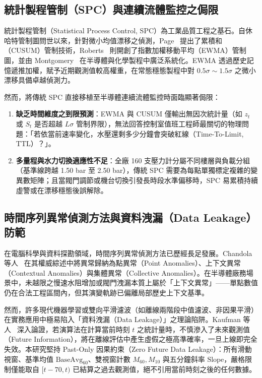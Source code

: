 \documentclass[fontset=none, a4paper, 12pt]{ctexart}
\begin{document}
\begin{doublespace}
\subsection{統計製程管制（SPC）與連續流體監控之侷限}
統計製程管制（Statistical Process Control, SPC）為工業品質工程之基石。自休哈特管制圖問世以來，針對微小均值漂移之偵測，Page~\cite{page1954continuous} 提出了累積和（CUSUM）管制技術，Roberts~\cite{roberts1959control} 則開創了指數加權移動平均（EWMA）管制圖，並由 Montgomery~\cite{montgomery2020statistical} 在半導體與化學製程中廣泛系統化。EWMA 透過歷史記憶遞推加權，賦予近期觀測值較高權重，在常態穩態製程中對 $0.5\sigma \sim 1.5\sigma$ 之微小漂移具備卓越偵測力。

然而，將傳統 SPC 直接移植至半導體連續流體監控時面臨顯著侷限：
\begin{enumerate}
    \item \textbf{缺乏時間維度之到限預測}：EWMA 與 CUSUM 僅輸出無因次統計量（如 $z_t$ 或 $S_t$ 是否超越 $L\sigma$ 管制界限），無法回答控制室值班工程師最關切的物理問題：「若依當前速率變化，水壓還剩多少分鐘會突破紅線（Time-To-Limit, TTL）？」。
    \item \textbf{多量程與水力切換適應性不足}：全廠 160 支壓力計分屬不同樓層與負載分組（基準線跨越 1.50 bar 至 2.50 bar），傳統 SPC 需要為每點單獨標定複雜的變異數矩陣；且當閥門調節或機台切換引發長時段水準偏移時，SPC 易累積持續虛警或在漂移穩態後誤解除。
\end{enumerate}

\subsection{時間序列異常偵測方法與資料洩漏（Data Leakage）防範}
在電腦科學與資料探勘領域，時間序列異常偵測方法已歷經長足發展。Chandola 等人~\cite{chandola2009anomaly} 在其權威綜述中將異常歸納為點異常（Point Anomalies）、上下文異常（Contextual Anomalies）與集體異常（Collective Anomalies）。在半導體廠務場景中，未越限之慢速水阻增加或閥門洩漏本質上屬於「上下文異常」——單點數值仍在合法工程區間內，但其演變軌跡已偏離局部歷史上下文基準。

然而，許多現代機器學習或雙向平滑濾波（如離線兩階段中值濾波、非因果平滑）在實務應用中極易陷入「資料洩漏（Data Leakage）」之理論陷阱。Kaufman 等人~\cite{kaufman2012leakage} 深入論證，若演算法在計算當前時刻 $t$ 之統計量時，不慎滲入了未來觀測值（Future Information），將在離線評估中產生虛假之極高準確率，一旦上線即完全失效。本研究堅持 Past-Only 因果約束（Zero Future Data Leakage）：所有滑動視窗、基準均值 $\mathrm{BaseAvg}_{60}$、雙視窗計數 $M_{60}, M_{10}$ 與五分鐘斜率 $\mathrm{Slope}$，嚴格限制僅能取自 $[t-70, t)$ 已結算之過去觀測值，絕不引用當前時刻之後的任何數據。


\end{doublespace}
\end{document}
